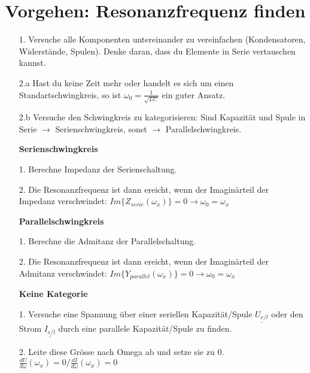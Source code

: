 \section{Vorgehen: Resonanzfrequenz finden}

\begin{itemize}
\item [1.] Versuche alle Komponenten untereinander zu vereinfachen (Kondensatoren, Widerstände, Spulen). Denke daran, dass du Elemente in Serie vertauschen kannst.
\item [2.a] Hast du keine Zeit mehr oder handelt es sich um einen Standartschwingkreis, so ist $\omega_0 = \frac{1}{\sqrt{LC}}$ ein guter Ansatz.
\item [2.b] Versuche den Schwingkreis zu kategorisieren: Sind Kapazität und Spule in Serie $\rightarrow$ Serienschwingkreis, sonst $\rightarrow$ Parallelschwingkreis. \\
\item []\textbf{Serienschwingkreis}
\item[1.] Berechne Impedanz der Serienschaltung.
\item [2.] Die Resonanzfrequenz ist dann ereicht, wenn der Imaginärteil der Impedanz verschwindet: $Im\{Z_{serie}(\omega_x)\} = 0 \rightarrow \omega_0 = \omega_x$ \\
\item []\textbf{Parallelschwingkreis}
\item [1.]Berechne die Admitanz der Parallelschaltung.
\item [2.] Die Resonanzfrequenz ist dann ereicht, wenn der Imaginärteil der Admitanz verschwindet: $Im\{Y_{parallel}(\omega_x)\} = 0 \rightarrow \omega_0 = \omega_x$ \\

\item []\textbf{Keine Kategorie}
\item [1.] Versuche eine Spannung über einer seriellen Kapazität/Spule $\underline{U_{c/l}}$ oder den Strom $\underline{I_{c/l}}$ durch eine parallele Kapazität/Spule zu finden.
\item [2.] Leite diese Grösse nach Omega ab und setze sie zu 0. $\frac{dU}{d\omega} (\omega_x) = 0 / \frac{dI}{d\omega} (\omega_x) = 0$
\end{itemize}
